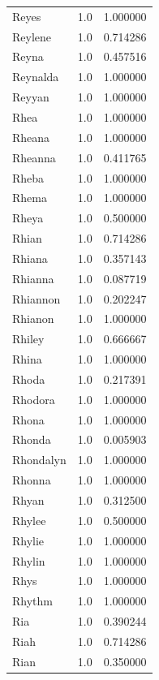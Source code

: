 \documentclass[
  letterpaper,
  DIV=11,
  numbers=noendperiod]{scrreprt}
\begin{document}
\begin{tabular}{lrr}
Reyes           &   1.0 &   1.000000 \\
Reylene         &   1.0 &   0.714286 \\
Reyna           &   1.0 &   0.457516 \\
Reynalda        &   1.0 &   1.000000 \\
Reyyan          &   1.0 &   1.000000 \\
Rhea            &   1.0 &   1.000000 \\
Rheana          &   1.0 &   1.000000 \\
Rheanna         &   1.0 &   0.411765 \\
Rheba           &   1.0 &   1.000000 \\
Rhema           &   1.0 &   1.000000 \\
Rheya           &   1.0 &   0.500000 \\
Rhian           &   1.0 &   0.714286 \\
Rhiana          &   1.0 &   0.357143 \\
Rhianna         &   1.0 &   0.087719 \\
Rhiannon        &   1.0 &   0.202247 \\
Rhianon         &   1.0 &   1.000000 \\
Rhiley          &   1.0 &   0.666667 \\
Rhina           &   1.0 &   1.000000 \\
Rhoda           &   1.0 &   0.217391 \\
Rhodora         &   1.0 &   1.000000 \\
Rhona           &   1.0 &   1.000000 \\
Rhonda          &   1.0 &   0.005903 \\
Rhondalyn       &   1.0 &   1.000000 \\
Rhonna          &   1.0 &   1.000000 \\
Rhyan           &   1.0 &   0.312500 \\
Rhylee          &   1.0 &   0.500000 \\
Rhylie          &   1.0 &   1.000000 \\
Rhylin          &   1.0 &   1.000000 \\
Rhys            &   1.0 &   1.000000 \\
Rhythm          &   1.0 &   1.000000 \\
Ria             &   1.0 &   0.390244 \\
Riah            &   1.0 &   0.714286 \\
Rian            &   1.0 &   0.350000 \\

\end{tabular}
\end{document}
